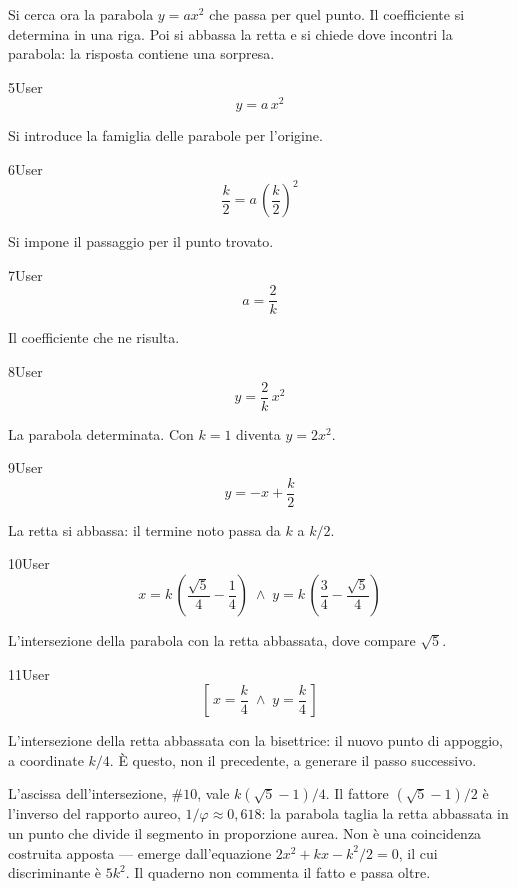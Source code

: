 Si cerca ora la parabola $y=ax^2$ che passa per quel punto. Il coefficiente si determina in una riga. Poi si abbassa la retta e si chiede dove incontri la parabola: la risposta contiene una sorpresa.

\begin{espr}{5}{User}{}
\[
y = a\, x^{2}
\]
\end{espr}
Si introduce la famiglia delle parabole per l'origine.

\begin{espr}{6}{User}{}
\[
\frac{k}{2} = a\, \left(\frac{k}{2}\right)^{2}
\]
\end{espr}
Si impone il passaggio per il punto trovato.

\begin{espr}{7}{User}{}
\[
a = \frac{2}{k}
\]
\end{espr}
Il coefficiente che ne risulta.

\begin{espr}{8}{User}{}
\[
y = \frac{2}{k}\, x^{2}
\]
\end{espr}
La parabola determinata. Con $k=1$ diventa $y=2x^2$.

\begin{espr}{9}{User}{}
\[
y = -x + \frac{k}{2}
\]
\end{espr}
La retta si abbassa: il termine noto passa da $k$ a $k/2$.

\begin{espr}{10}{User}{}
\[
x = k\, \left(\frac{\sqrt{5}}{4} - \frac{1}{4}\right) \;\land\; y = k\, \left(\frac{3}{4} - \frac{\sqrt{5}}{4}\right)
\]
\end{espr}
L'intersezione della parabola con la retta abbassata, dove compare $\sqrt5$.

\begin{espr}{11}{User}{}
\[
\left[\, x = \frac{k}{4} \;\land\; y = \frac{k}{4} \,\right]
\]
\end{espr}
L'intersezione della retta abbassata con la bisettrice: il nuovo punto di appoggio, a coordinate $k/4$. È questo, non il precedente, a generare il passo successivo.


L'ascissa dell'intersezione, $\#10$, vale $k(\sqrt5-1)/4$. Il fattore $(\sqrt5-1)/2$ è l'inverso del rapporto aureo, $1/\varphi\approx 0{,}618$: la parabola taglia la retta abbassata in un punto che divide il segmento in proporzione aurea. Non è una coincidenza costruita apposta — emerge dall'equazione $2x^2+kx-k^2/2=0$, il cui discriminante è $5k^2$. Il quaderno non commenta il fatto e passa oltre.

